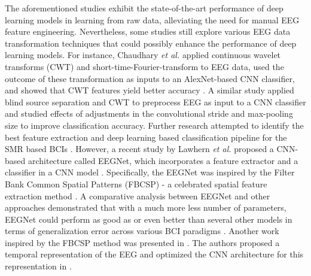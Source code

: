 \documentclass{ieeeaccess}
\begin{document}
The aforementioned studies exhibit the state-of-the-art performance of deep learning models in learning from raw data, alleviating the need for manual EEG feature engineering. Nevertheless, some studies still explore various EEG data transformation techniques that could possibly enhance the performance of deep learning models. For instance, Chaudhary \textit{et al.} \cite{chaudhary2019convolutional} applied continuous wavelet transforms (CWT) and short-time-Fourier-transform to EEG data, used the outcome of these transformation as inputs to an AlexNet-based CNN classifier, and showed that CWT features yield better accuracy \cite{krizhevsky2012imagenet}. A similar study \cite{ortiz2019new} applied blind source separation and CWT to preprocess EEG as input to a CNN classifier \cite{zhang2019novelx} and studied effects of adjustments in the convolutional stride and max-pooling size to improve classification accuracy.    
Further research attempted to identify the best feature extraction and deep learning based classification pipeline for the SMR based BCIs \cite{craik2019deep, roy2019deep, lotte2018review}. However,  a recent study by Lawhern \textit{et al.} proposed a CNN-based architecture called EEGNet, which incorporates a feature extractor and a classifier in a CNN model \cite{lawhern2016eegnet}. Specifically, the EEGNet was inspired by the Filter Bank Common Spatial Patterns (FBCSP) - a celebrated spatial feature extraction method \cite{angbci, ang2008filter}. A comparative analysis between EEGNet and other approaches demonstrated that with a much more less number of parameters, EEGNet could perform as good as or even better than several other models in terms of generalization error across various BCI paradigms \cite{lawhern2016eegnet}. Another work inspired by the FBCSP method was presented in \cite{sakhavi2018learning, zhu2019separated}. The authors proposed a temporal representation of the EEG and optimized the CNN architecture for this representation in \cite{sakhavi2018learning}. 
\end{document}
